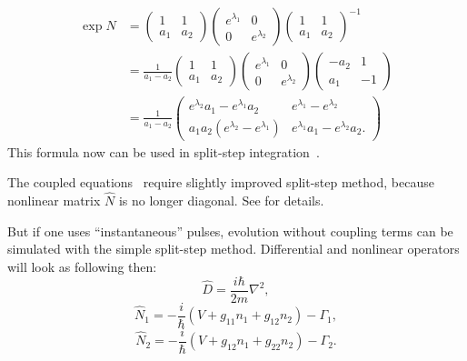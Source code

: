 \begin{equation}
\begin{split}
	\exp \hat{N} & = \begin{pmatrix}
		1 & 1 \\ a_1 & a_2
	\end{pmatrix}
	\begin{pmatrix}
		e^{\lambda_1} & 0 \\ 0 & e^{\lambda_2}
	\end{pmatrix}
	\begin{pmatrix}
		1 & 1 \\ a_1 & a_2
	\end{pmatrix}^{-1} \\
	& = \frac{1}{a_1 - a_2}
	\begin{pmatrix}
		1 & 1 \\ a_1 & a_2
	\end{pmatrix}
	\begin{pmatrix}
		e^{\lambda_1} & 0 \\ 0 & e^{\lambda_2}
	\end{pmatrix}
	\begin{pmatrix}
		-a_2 & 1 \\ a_1 & -1
	\end{pmatrix} \\
	& = \frac{1}{a_1 - a_2}
	\begin{pmatrix}
		e^{\lambda_2} a_1 - e^{\lambda_1} a_2 &
		e^{\lambda_1} - e^{\lambda_2} \\
		a_1 a_2 (e^{\lambda_2} - e^{\lambda_1}) &
		e^{\lambda_1} a_1 - e^{\lambda_2} a_2.
	\end{pmatrix}
\end{split}
\end{equation}
This formula now can be used in split-step integration~.

The coupled equations~ require slightly improved split-step method, because nonlinear matrix $\hat{N}$ is no longer diagonal.
See  for details.

But if one uses ``instantaneous'' pulses, evolution without coupling terms can be simulated with the simple split-step method.
Differential and nonlinear operators will look as following then:
\[
	\hat{D} = \frac{i \hbar}{2m} \nabla^2,
\]
\[
	\hat{N}_1 = -\frac{i}{\hbar} \left( V + g_{11} n_1 + g_{12} n_2 \right) - \Gamma_1,
\]
\[
	\hat{N}_2 = -\frac{i}{\hbar} \left( V + g_{12} n_1 + g_{22} n_2 \right) - \Gamma_2.
\]
